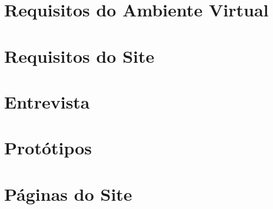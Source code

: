 \chapter{Requisitos do Ambiente Virtual}\label{apendice}


\chapter{Requisitos do Site} \label{Apendice B}


\chapter{Entrevista}\label{ap:entrevista}


\chapter{Protótipos}\label{prototipos}


\chapter{Páginas do Site}\label{apendice paginas site}
\label{ap:páginas_do_site}
